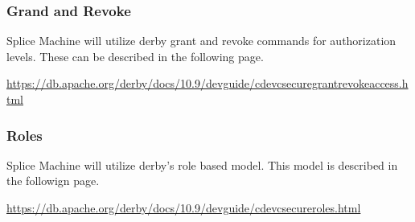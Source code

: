 \subsubsection{Grand and Revoke}

Splice Machine will utilize derby grant and revoke commands for
authorization levels.  These can be described in the following page.

\url{https://db.apache.org/derby/docs/10.9/devguide/cdevcsecuregrantrevokeaccess.html}

\subsubsection{Roles}

Splice Machine will utilize derby's role based model.  This model is described
in the followign page.

\url{https://db.apache.org/derby/docs/10.9/devguide/cdevcsecureroles.html}

